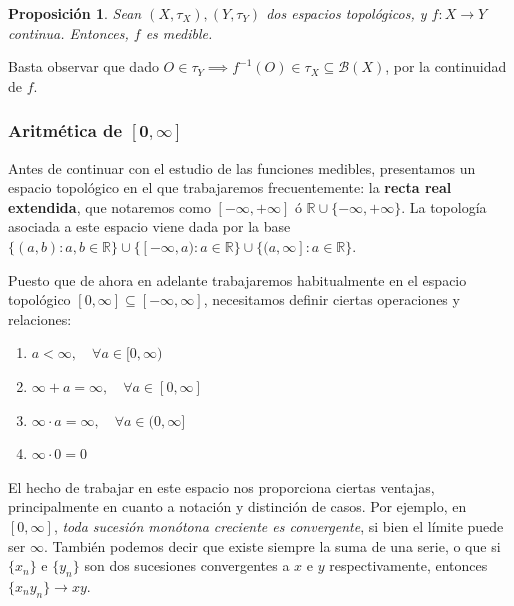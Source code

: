 \documentclass[11pt, a4paper]{article}
\makeatletter
\newif\IfInSansMode
\let\oldsf\sffamily
\renewcommand*{\sffamily}{\oldsf\mathversion{sans}\InSansModetrue}
\let\oldnorm\normalfont
\renewcommand*{\normalfont}{\oldnorm\InSansModefalse\mathversion{normal}}
\newcommand{\bm}[1]{\boldsymbol{#1}}
\newcommand{\xn}{\{x_n\}}
\renewenvironment{proof}[1][\proofname] {\par\pushQED{\qed}\normalfont\topsep6\p@\@plus6\p@\relax\trivlist\item[\hskip\labelsep\itshape\sffamily#1\@addpunct{.}]\ignorespaces}{\popQED\endtrivlist\@endpefalse}
\theoremstyle{theorem-style}
\newtheorem{nprop}{Proposición}[section]
\theoremstyle{definition-style}
\theoremstyle{remark-style}
\theoremstyle{example-style}
\newenvironment{nlist}
{\begin{enumerate}
    \renewcommand\labelenumi{(\emph{\roman{enumi})}}}
  {\end{enumerate}}
\makeatother
\begin{document}
\begin{nprop} Sean $(X,\tau_X), (Y, \tau_Y)$ dos espacios topológicos, y $f:X\longrightarrow Y$ continua. Entonces, $f$ es medible.
\end{nprop}

\begin{proof} Basta observar que dado $O \in \tau_Y \implies f^{-1}(O) \in \tau_X \subseteq \mathcal B(X)$, por la continuidad de $f$.
\end{proof}


\subsubsection*{Aritmética de $\bm{[0,\infty]}$}

Antes de continuar con el estudio de las funciones medibles, presentamos un espacio topológico en el que trabajaremos frecuentemente: la \textbf{recta real extendida}, que notaremos como $[-\infty,+\infty]$ ó $\mathbb{R} \cup \{-\infty, +\infty\}$. La topología asociada a este espacio viene dada por la base $\{(a,b): a,b \in \mathbb{R}\} \cup \{[-\infty, a): a \in \mathbb{R}\} \cup \{(a,\infty]: a \in \mathbb{R}\}$.

Puesto que de ahora en adelante trabajaremos habitualmente en el espacio topológico $[0,\infty] \subseteq [-\infty,\infty]$, necesitamos definir ciertas operaciones y relaciones:
\begin{nlist}
\item $a < \infty, \quad \forall a \in [0,\infty)$
\item $\infty + a = \infty, \quad \forall a \in [0,\infty]$
\item $\infty \cdot a = \infty, \quad \forall a \in (0,\infty]$
\item $\infty \cdot 0 = 0$
\end{nlist}

El hecho de trabajar en este espacio nos proporciona ciertas ventajas, principalmente en cuanto a notación y distinción de casos. Por ejemplo, en $[0, \infty]$, \textit{toda sucesión monótona creciente es convergente}, si bien el límite puede ser $\infty$. También podemos decir que existe siempre la suma de una serie, o que si $\xn$ e $\{y_n\}$ son dos sucesiones convergentes a $x$ e $y$ respectivamente, entonces $\{x_ny_n\} \to xy$.
\end{document}
